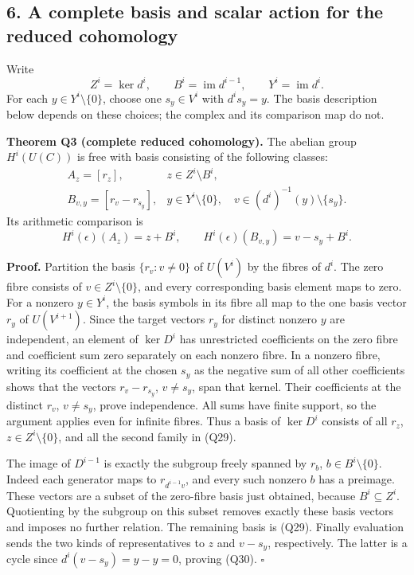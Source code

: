 \documentclass[
]{article}
\begin{document}
\subsection{6. A complete basis and scalar action for the reduced
cohomology}\label{a-complete-basis-and-scalar-action-for-the-reduced-cohomology}

Write \[
Z^i=\ker d^i,\qquad B^i=\operatorname{im}d^{i-1},\qquad Y^i=\operatorname{im}d^i.
\tag{Q28}
\] For each \(y\in Y^i\setminus\{0\}\), choose one \(s_y\in V^i\) with
\(d^is_y=y\). The basis description below depends on these choices; the
complex and its comparison map do not.

\textbf{Theorem Q3 (complete reduced cohomology).} The abelian group
\(H^i(U(C))\) is free with basis consisting of the following classes: \[
\begin{array}{ll}
A_z=[r_z],&z\in Z^i\setminus B^i,\\
B_{v,y}=[r_v-r_{s_y}],&y\in Y^i\setminus\{0\},\quad
v\in(d^i)^{-1}(y)\setminus\{s_y\}.
\end{array}
\tag{Q29}
\] Its arithmetic comparison is \[
H^i(\epsilon)(A_z)=z+B^i,
\qquad H^i(\epsilon)(B_{v,y})=v-s_y+B^i.
\tag{Q30}
\]

\textbf{Proof.} Partition the basis \(\{r_v:v\ne0\}\) of \(U(V^i)\) by
the fibres of \(d^i\). The zero fibre consists of
\(v\in Z^i\setminus\{0\}\), and every corresponding basis element maps
to zero. For a nonzero \(y\in Y^i\), the basis symbols in its fibre all
map to the one basis vector \(r_y\) of \(U(V^{i+1})\). Since the target
vectors \(r_y\) for distinct nonzero \(y\) are independent, an element
of \(\ker D^i\) has unrestricted coefficients on the zero fibre and
coefficient sum zero separately on each nonzero fibre. In a nonzero
fibre, writing its coefficient at the chosen \(s_y\) as the negative sum
of all other coefficients shows that the vectors \(r_v-r_{s_y}\),
\(v\ne s_y\), span that kernel. Their coefficients at the distinct
\(r_v\), \(v\ne s_y\), prove independence. All sums have finite support,
so the argument applies even for infinite fibres. Thus a basis of
\(\ker D^i\) consists of all \(r_z\), \(z\in Z^i\setminus\{0\}\), and
all the second family in (Q29).

The image of \(D^{i-1}\) is exactly the subgroup freely spanned by
\(r_b\), \(b\in B^i\setminus\{0\}\). Indeed each generator maps to
\(r_{d^{i-1}v}\), and every such nonzero \(b\) has a preimage. These
vectors are a subset of the zero-fibre basis just obtained, because
\(B^i\subseteq Z^i\). Quotienting by the subgroup on this subset removes
exactly these basis vectors and imposes no further relation. The
remaining basis is (Q29). Finally evaluation sends the two kinds of
representatives to \(z\) and \(v-s_y\), respectively. The latter is a
cycle since \(d^i(v-s_y)=y-y=0\), proving (Q30). \(\square\)
\end{document}
